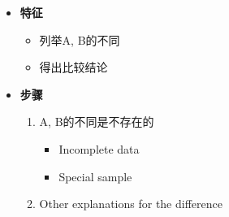     \begin{itemize}
      \item \textbf{特征}
      \begin{itemize}
        \item 列举A, B的不同
        \item 得出比较结论
      \end{itemize}

      \item \textbf{步骤}
      \begin{enumerate}
        \item A, B的不同是不存在的
        \begin{itemize}
          \item Incomplete data
          \item Special sample
        \end{itemize}

        \item Other explanations for the difference
      \end{enumerate}
    \end{itemize}
